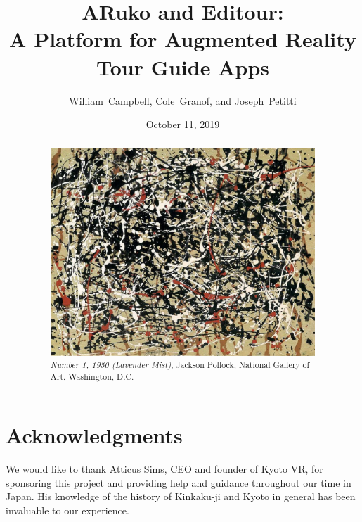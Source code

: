 \documentclass[a4paper, 10pt, american, titlepage]{article}
\title{%
	\huge ARuko and Editour: \\
	\Large A Platform for Augmented Reality Tour Guide Apps}
\author{William~Campbell, Cole~Granof, and Joseph~Petitti}
\date{October 11, 2019}
\begin{document}

\maketitle


\begin{abstract}
	\begin{figure}[h]
		\centering
		\includegraphics[width=\textwidth]{abstract.jpg}
		\caption[\textit{Number 1, 1950 (Lavender Mist)}, Jackson Pollock]
		{\textit{Number 1, 1950 (Lavender Mist)}, Jackson Pollock, National
			Gallery of Art, Washington, D.C.}
		\label{fig:abstract}
	\end{figure}
\end{abstract}

\section*{Acknowledgments}
\label{sec:acknowledgements}

We would like to thank Atticus Sims, CEO and founder of Kyoto VR, for sponsoring
this project and providing help and guidance throughout our time in Japan. His
knowledge of the history of Kinkaku-ji and Kyoto in general has been invaluable
to our experience.
\end{document}
